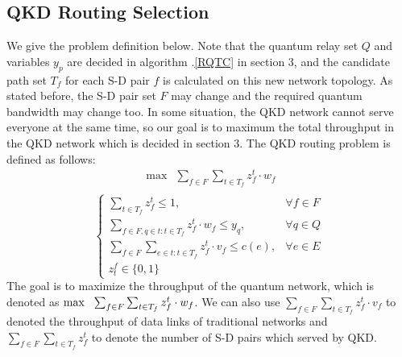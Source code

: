 \subsection{QKD Routing Selection}
We give the problem definition below. Note that the quantum relay set $Q$ and variables $y_p$ are decided in algorithm .\ref{RQTC} in section 3, and the candidate path set $T_f$ for each S-D pair $f$ is calculated on this new network topology.
As stated before, the S-D pair set $F$ may change and the required quantum bandwidth may change too. In some situation, the QKD network cannot serve everyone at the same time, so our goal is to maximum the total throughput in the QKD network which is decided in section 3. The QKD routing problem is defined as follows:
	\begin{equation*}
    \begin{aligned}
    \max \ \ \sum_{f \in F}\sum_{t \in T_f}{z_f^t \cdot w_f} \\
    \end{aligned}
	\end{equation*}
	\begin{equation}\label{eq:throughput}
	\begin{cases}
     \sum_{t \in T_f}{z_f^t} \le 1, & \forall f \in F \\
     \sum_{f \in F,q \in t:t \in T_f}{z_f^t \cdot w_f} \le  y_q, & \forall q \in Q \\
     \sum_{f \in F}\sum_{e \in t:t \in T_f}{z_f^t \cdot v_f} \le c(e), & \forall e \in E \\
     z^f_t \in \{0,1\}

	\end{cases}
	\end{equation}
The goal is to maximize the throughput of the quantum network, which is denoted as $\max \ \ \sum_{f \in F}\sum_{t \in T_f}{z_f^t \cdot w_f} \\$. We can also use $\sum_{f \in F}\sum_{t \in T_f}{z_f^t \cdot v_f}$ to denoted the throughput of data links of traditional networks and $\sum_{f \in F}\sum_{t \in T_f}{z_f^t}$ to denote the number of S-D pairs which served by QKD.

